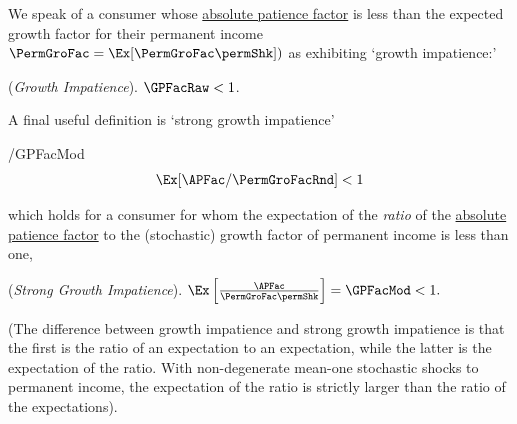 \documentclass[\econtexRoot/BufferStockTheory]{subfiles}
\begin{document}
We speak of a consumer whose \hyperlink{APFac}{absolute patience factor} is less than the expected growth factor for their permanent income $\PermGroFac = \Ex[\PermGroFac \permShk])$ as exhibiting `growth impatience:' 
\hypertarget{GICRaw}{}
\begin{assumS}\label{ass:GICRaw} (\textit{Growth Impatience}).
$ \GPFacRaw  < 1$.
\end{assumS}

A final useful definition is `strong growth impatience'
\begin{verbatimwrite}{\EqDir/GPFacMod}
  \begin{equation}\label{eq:GPFacMod}
    \Ex[\APFac/\PermGroFacRnd] < 1
  \end{equation}
\end{verbatimwrite}

which holds for a consumer for whom the expectation of the \textit{ratio} of the \hyperlink{APFac}{absolute patience factor} to the (stochastic) growth factor of permanent income is less than one, 
\hypertarget{GICMod}{}
\begin{assumS}(\textit{Strong Growth Impatience}). \label{ass:GICMod}
$ \Ex\left[\frac{\APFac}{\PermGroFac \permShk}\right] = \GPFacMod  < 1.$
\end{assumS}

(The difference between growth impatience and strong growth impatience is that the first is the ratio of an expectation to an expectation, while the latter is the expectation of the ratio.
With non-degenerate mean-one stochastic shocks to permanent income, the expectation of the ratio is strictly larger than the ratio of the expectations).

\end{document}

